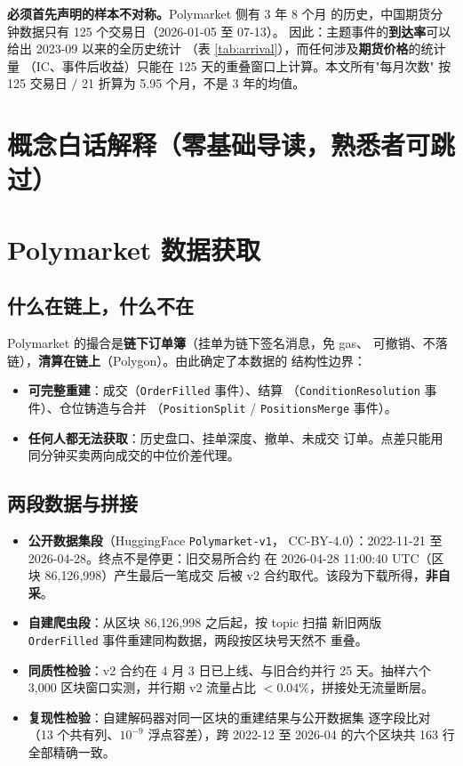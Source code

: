 \documentclass[11pt, a4paper]{ctexart}
\newcommand{\code}[1]{\texttt{\small #1}}
\begin{document}
\noindent\textbf{必须首先声明的样本不对称。}Polymarket 侧有 3 年 8 个月
的历史，中国期货分钟数据只有 125 个交易日（2026-01-05 至 07-13）。
因此：主题事件的\textbf{到达率}可以给出 2023-09 以来的全历史统计
（表 \ref{tab:arrival}），而任何涉及\textbf{期货价格}的统计量
（IC、事件后收益）只能在 125 天的重叠窗口上计算。本文所有"每月次数"
按 125 交易日 $/$ 21 折算为 5.95 个月，不是 3 年的均值。

\section{概念白话解释（零基础导读，熟悉者可跳过）}\label{sec:glossary}


\section{Polymarket 数据获取}\label{sec:acquire}

\subsection{什么在链上，什么不在}

Polymarket 的撮合是\textbf{链下订单簿}（挂单为链下签名消息，免 gas、
可撤销、不落链），\textbf{清算在链上}（Polygon）。由此确定了本数据的
结构性边界：

\begin{itemize}
\item \textbf{可完整重建}：成交（\code{OrderFilled} 事件）、结算
  （\code{ConditionResolution} 事件）、仓位铸造与合并
  （\code{PositionSplit} / \code{PositionsMerge} 事件）。
\item \textbf{任何人都无法获取}：历史盘口、挂单深度、撤单、未成交
  订单。点差只能用同分钟买卖两向成交的中位价差代理。
\end{itemize}

\subsection{两段数据与拼接}

\begin{itemize}
\item \textbf{公开数据集段}（HuggingFace \code{Polymarket-v1}，
  CC-BY-4.0）：2022-11-21 至 2026-04-28。终点不是停更：旧交易所合约
  在 2026-04-28 11:00:40 UTC（区块 86{,}126{,}998）产生最后一笔成交
  后被 v2 合约取代。该段为下载所得，\textbf{非自采}。
\item \textbf{自建爬虫段}：从区块 86{,}126{,}998 之后起，按 topic 扫描
  新旧两版 \code{OrderFilled} 事件重建同构数据，两段按区块号天然不
  重叠。
\item \textbf{同质性检验}：v2 合约在 4 月 3 日已上线、与旧合约并行
  25 天。抽样六个 3{,}000 区块窗口实测，并行期 v2 流量占比
  $<0.04\%$，拼接处无流量断层。
\item \textbf{复现性检验}：自建解码器对同一区块的重建结果与公开数据集
  逐字段比对（13 个共有列、$10^{-9}$ 浮点容差），跨 2022-12 至
  2026-04 的六个区块共 163 行全部精确一致。
\end{itemize}
\end{document}

